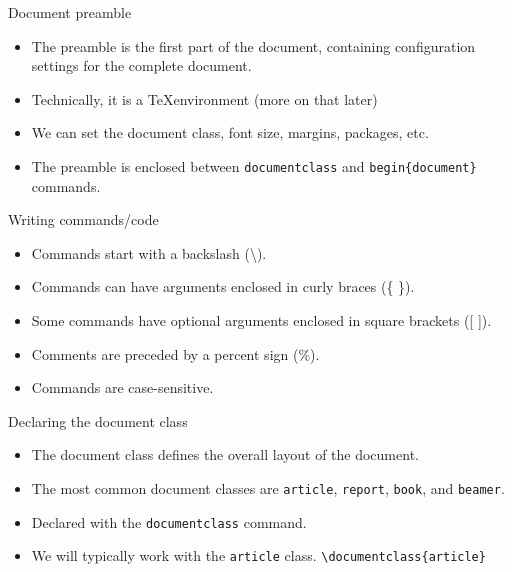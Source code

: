 \documentclass[t,12pt,xcolor=dvipsnames]{beamer}
\begin{document}
\begin{frame}{Document preamble}
    \begin{itemize}
        \item The preamble is the first part of the document, containing configuration settings for the complete document.
        \item Technically, it is a \TeX environment (more on that later)
        \item We can set the document class, font size, margins, packages, etc.
        \item The preamble is enclosed between \texttt{documentclass} and \texttt{begin\{document\}} commands.
    \end{itemize}
\end{frame}

\begin{frame}{Writing commands/code}
    \begin{itemize}
        \item Commands start with a backslash (\textbackslash).
        \item Commands can have arguments enclosed in curly braces (\{ \}).
        \item Some commands have optional arguments enclosed in square brackets ([ ]).
        \item Comments are preceded by a percent sign (\%).
        \item Commands are case-sensitive.
    \end{itemize}
\end{frame}

\begin{frame}{Declaring the document class}
    \begin{itemize}
        \item The document class defines the overall layout of the document.
        \item The most common document classes are \texttt{article}, \texttt{report}, \texttt{book}, and \texttt{beamer}.
        \item Declared with the \texttt{documentclass} command.
        \item We will typically work with the \texttt{article} class.
    \texttt{\textbackslash documentclass\{article\}}
    \end{itemize}
\end{frame}
\end{document}

